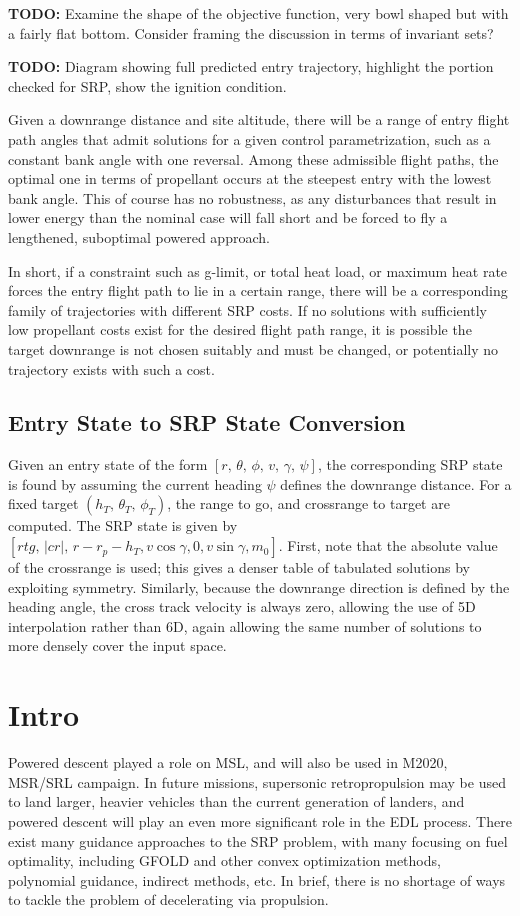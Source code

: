\documentclass[]{article}
\begin{document}
\textbf{TODO:} Examine the shape of the objective function, very bowl shaped but with a fairly flat bottom. Consider framing the discussion in terms of invariant sets? 

\textbf{TODO:} Diagram showing full predicted entry trajectory, highlight the portion checked for SRP, show the ignition condition.

Given a downrange distance and site altitude, there will be a range of entry flight path angles that admit solutions for a given control parametrization, such as a constant bank angle with one reversal. Among these admissible flight paths, the optimal one in terms of propellant occurs at the steepest entry with the lowest bank angle. This of course has no robustness, as any disturbances that result in lower energy than the nominal case will fall short and be forced to fly a lengthened, suboptimal powered approach. 

In short, if a constraint such as g-limit, or total heat load, or maximum heat rate forces the entry flight path to lie in a certain range, there will be a corresponding family of trajectories with different SRP costs. If no solutions with sufficiently low propellant costs exist for the desired flight path range, it is possible the target downrange is not chosen suitably and must be changed, or potentially no trajectory exists with such a cost. 

\subsection{Entry State to SRP State Conversion}
Given an entry state of the form $[r,\, \theta,\, \phi,\, v,\, \gamma,\, \psi]$, the corresponding SRP state is found by assuming the current heading $\psi$ defines the downrange distance. For a fixed target $(h_T,\, \theta_T,\, \phi_T)$, the range to go, and crossrange to target are computed. The SRP state is given by $[rtg,\, |cr|,\, r-r_p-h_T, v\cos\gamma, 0, v\sin\gamma, m_0]$. First, note that the absolute value of the crossrange is used; this gives a denser table of tabulated solutions by exploiting symmetry. Similarly, because the downrange direction is defined by the heading angle, the cross track velocity is always zero, allowing the use of 5D interpolation rather than 6D, again allowing the same number of solutions to more densely cover the input space. 

\section{Intro}
Powered descent played a role on MSL, and will also be used in M2020, MSR/SRL campaign. In future missions, supersonic retropropulsion may be used to land larger, heavier vehicles than the current generation of landers, and powered descent will play an even more significant role in the EDL process. There exist many guidance approaches to the SRP problem, with many focusing on fuel optimality, including GFOLD and other convex optimization methods, polynomial guidance, indirect methods, etc. In brief, there is no shortage of ways to tackle the problem of decelerating via propulsion. 
\end{document}
